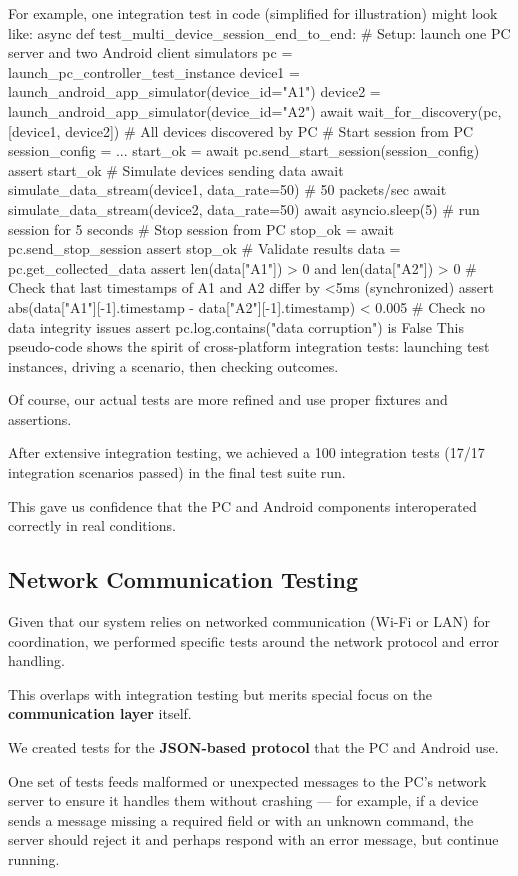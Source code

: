 {{For example, one integration test in code (simplified for illustration) might look
like: async def test\_multi\_device\_session\_end\_to\_end: # Setup: launch one PC
server and two Android client simulators pc = launch\_pc\_controller\_test\_instance
device1 = launch\_android\_app\_simulator(device\_id="A1") device2 =
launch\_android\_app\_simulator(device\_id="A2") await wait\_for\_discovery(pc,
[device1, device2]) # All devices discovered by PC # Start session from PC
session\_config = {...} start\_ok = await pc.send\_start\_session(session\_config)
assert start\_ok # Simulate devices sending data await
simulate\_data\_stream(device1, data\_rate=50) # 50 packets/sec await
simulate\_data\_stream(device2, data\_rate=50) await asyncio.sleep(5) # run session
for 5 seconds # Stop session from PC stop\_ok = await pc.send\_stop\_session assert
stop\_ok # Validate results data = pc.get\_collected\_data assert len(data["A1"]) > 0
and len(data["A2"]) > 0 # Check that last timestamps of A1 and A2 differ by <5ms
(synchronized) assert abs(data["A1"][-1].timestamp - data["A2"][-1].timestamp) <
0.005 # Check no data integrity issues assert pc.log.contains("data corruption") is
False This pseudo-code shows the spirit of cross-platform integration tests:
launching test instances, driving a scenario, then checking outcomes.

Of course, our actual tests are more refined and use proper fixtures and assertions.

After extensive integration testing, we achieved a 100%
integration tests (17/17 integration scenarios passed) in the final test suite run.

This gave us confidence that the PC and Android components interoperated correctly in
real conditions.

\subsection{Network Communication Testing}

Given that our system relies on networked communication (Wi-Fi or LAN) for
coordination, we performed specific tests around the network protocol and error
handling.

This overlaps with integration testing but merits special focus on the
\textbf{communication layer}
 itself.

We created tests for the \textbf{JSON-based protocol}
 that the PC and Android use.

One set of tests feeds malformed or unexpected messages to the PC's network server to
ensure it handles them without crashing --- for example, if a device sends a message
missing a required field or with an unknown command, the server should reject it and
perhaps respond with an error message, but continue running.

}}
